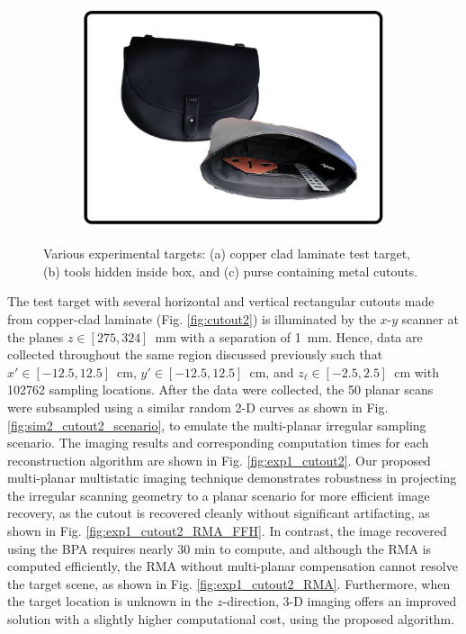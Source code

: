 \documentclass{ieeeaccess}
\begin{document}
\begin{figure}[h]
\begin{subfigure}[b]{0.23\textwidth}
         \centering
         \includegraphics[width=\textwidth]{smith18.png} %
         \caption{}
         \label{fig:purse}
    \end{subfigure}
\caption{Various experimental targets: (a) copper clad laminate test target, (b) tools hidden inside box, and (c) purse containing metal cutouts.}
\label{fig:targets}
\end{figure}

The test target with several horizontal and vertical rectangular cutouts made from copper-clad laminate (Fig. \ref{fig:cutout2}) is illuminated by the $x$-$y$ scanner at the planes \mbox{$z \in [275, 324]$ mm} with a separation of \mbox{1 mm}. 
Hence, data are collected throughout the same region discussed previously such that \mbox{$x' \in [-12.5,12.5]$ cm}, \mbox{$y' \in [-12.5,12.5]$ cm}, and \mbox{$z_\ell \in [-2.5,2.5]$ cm} with 102762 sampling locations. 
After the data were collected, the 50 planar scans were subsampled using a similar random \mbox{2-D} curves as shown in Fig. \ref{fig:sim2_cutout2_scenario}, to emulate the multi-planar irregular sampling scenario.
The imaging results and corresponding computation times for each reconstruction algorithm are shown in Fig. \ref{fig:exp1_cutout2}.
Our proposed multi-planar multistatic imaging technique demonstrates robustness in projecting the irregular scanning geometry to a planar scenario for more efficient image recovery, as the cutout is recovered cleanly without significant artifacting, as shown in Fig. \ref{fig:exp1_cutout2_RMA_FFH}.
In contrast, the image recovered using the BPA requires nearly 30 min to compute, and although the RMA is computed efficiently, the RMA without multi-planar compensation cannot resolve the target scene, as shown in Fig. \ref{fig:exp1_cutout2_RMA}.
Furthermore, when the target location is unknown in the $z$-direction, \mbox{3-D} imaging offers an improved solution with a slightly higher computational cost, using the proposed algorithm.
\end{document}
